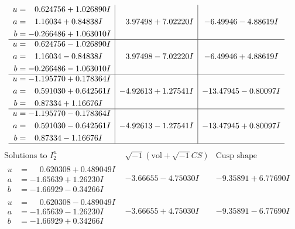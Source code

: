\documentclass[1p]{elsarticle_modified}
\theoremstyle{definition}
\newcommand{\I}{\sqrt{-1}}
\begin{document}
$$\begin{array}{c|c|c}
\begin{aligned}
u &= \phantom{-}0.624756 + 1.026890 I \\
a &= \phantom{-}1.16034 + 0.84838 I \\
b &= -0.266486 + 1.063010 I\end{aligned}
 & \phantom{-}3.97498 + 7.02220 I & -6.49946 - 4.88619 I \\ \hline\begin{aligned}
u &= \phantom{-}0.624756 - 1.026890 I \\
a &= \phantom{-}1.16034 - 0.84838 I \\
b &= -0.266486 - 1.063010 I\end{aligned}
 & \phantom{-}3.97498 - 7.02220 I & -6.49946 + 4.88619 I \\ \hline\begin{aligned}
u &= -1.195770 + 0.178364 I \\
a &= \phantom{-}0.591030 + 0.642561 I \\
b &= \phantom{-}0.87334 + 1.16676 I\end{aligned}
 & -4.92613 + 1.27541 I & -13.47945 - 0.80097 I \\ \hline\begin{aligned}
u &= -1.195770 - 0.178364 I \\
a &= \phantom{-}0.591030 - 0.642561 I \\
b &= \phantom{-}0.87334 - 1.16676 I\end{aligned}
 & -4.92613 - 1.27541 I & -13.47945 + 0.80097 I\\
 \hline 
 \end{array}$$\newpage$$\begin{array}{c|c|c}  
\text{Solutions to }I^u_{2}& \I (\text{vol} + \sqrt{-1}CS) & \text{Cusp shape}\\
 \hline 
\begin{aligned}
u &= \phantom{-}0.620308 + 0.489049 I \\
a &= -1.65639 + 1.26230 I \\
b &= -1.66929 - 0.34266 I\end{aligned}
 & -3.66655 - 4.75030 I & -9.35891 + 6.77690 I \\ \hline\begin{aligned}
u &= \phantom{-}0.620308 - 0.489049 I \\
a &= -1.65639 - 1.26230 I \\
b &= -1.66929 + 0.34266 I\end{aligned}
 & -3.66655 + 4.75030 I & -9.35891 - 6.77690 I \\ \hline\begin{aligned}

\end{aligned}
\end{array}$$
\end{document}
